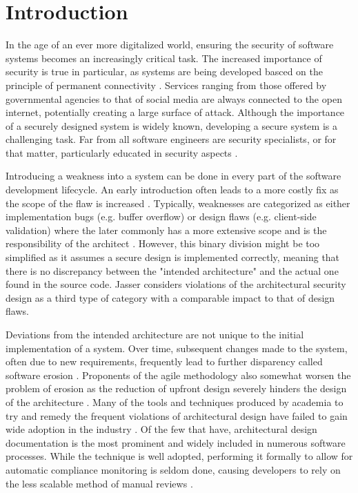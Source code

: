 \chapter{Introduction}
In the age of an ever more digitalized world, ensuring the security of software systems becomes an increasingly critical task. The increased importance of security is true in particular, as systems are being developed basced on the principle of permanent connectivity \cite{felderer_security_2016}.  Services ranging from those offered by governmental agencies to that of social media are always connected to the open internet, potentially creating a large surface of attack. Although the importance of a securely designed system is widely known, developing a secure system is a challenging task. Far from all software engineers are security specialists, or for that matter, particularly educated in security aspects \cite{yoshioka_survey_2008}.

Introducing a weakness into a system can be done in every part of the software development lifecycle. An early introduction often leads to a more costly fix as the scope of the flaw is increased \cite{mcgraw_software_2004}. Typically, weaknesses are categorized as either implementation bugs (e.g. buffer overflow) or design flaws (e.g. client-side validation) where the later commonly has a more extensive scope and is the responsibility of the architect \cite{arce_avoiding_2014}. However, this binary division might be too simplified as it assumes a secure design is implemented correctly, meaning that there is no discrepancy between the "intended architecture" and the actual one found in the source code. Jasser \cite{franch_constraining_2019} considers violations of the architectural security design as a third type of category with a comparable impact to that of design flaws.

Deviations from the intended architecture are not unique to the initial implementation of a system. Over time, subsequent changes made to the system, often due to new requirements, frequently lead to further disparency called software erosion \cite{de_silva_controlling_2012}. Proponents of the agile methodology also somewhat worsen the problem of erosion as the reduction of upfront design severely hinders the design of the architecture \cite{van_gurp_design_2002}. Many of the tools and techniques produced by academia to try and remedy the frequent violations of architectural design have failed to gain wide adoption in the industry \cite{de_silva_controlling_2012}.  Of the few that have, architectural design documentation is the most prominent and widely included in numerous software processes. While the technique is well adopted, performing it formally to allow for automatic compliance monitoring is seldom done, causing developers to rely on the less scalable method of manual reviews \cite{de_silva_controlling_2012}.

